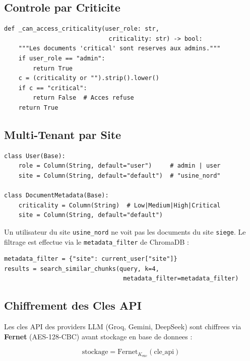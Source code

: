 \documentclass[12pt,a4paper]{article}
\begin{document}
\subsection{Controle par Criticite}

\begin{lstlisting}[style=pythonstyle, caption={Filtre criticite (main.py)}]
def _can_access_criticality(user_role: str,
                             criticality: str) -> bool:
    """Les documents 'critical' sont reserves aux admins."""
    if user_role == "admin":
        return True
    c = (criticality or "").strip().lower()
    if c == "critical":
        return False  # Acces refuse
    return True
\end{lstlisting}

\subsection{Multi-Tenant par Site}

\begin{lstlisting}[style=pythonstyle, caption={Isolation multi-tenant (database.py)}]
class User(Base):
    role = Column(String, default="user")     # admin | user
    site = Column(String, default="default")  # "usine_nord"

class DocumentMetadata(Base):
    criticality = Column(String)  # Low|Medium|High|Critical
    site = Column(String, default="default")
\end{lstlisting}

Un utilisateur du site \texttt{usine\_nord} ne voit pas les documents du site
\texttt{siege}. Le filtrage est effectue via le \texttt{metadata\_filter} de ChromaDB :

\begin{lstlisting}[style=pythonstyle]
metadata_filter = {"site": current_user["site"]}
results = search_similar_chunks(query, k=4,
                                 metadata_filter=metadata_filter)
\end{lstlisting}

\subsection{Chiffrement des Cles API}

Les cles API des providers LLM (Groq, Gemini, DeepSeek) sont chiffrees
via \textbf{Fernet} (AES-128-CBC) avant stockage en base de donnees :

\begin{equation}
\text{stockage} = \text{Fernet}_{K_\text{enc}}(\text{cle\_api})
\end{equation}
\end{document}
